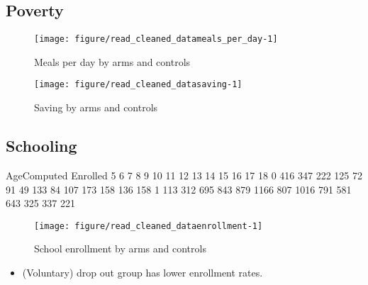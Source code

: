 \subsection{Poverty}


\begin{Schunk}
\begin{figure}

{\centering \texttt{[image: figure/read\_cleaned\_datameals\_per\_day-1]} 

}

\caption[Meals per day by arms and controls]{Meals per day by arms and controls}\label{Figure meals per day}
\end{figure}
\end{Schunk}
\begin{Schunk}
\begin{figure}

{\centering \texttt{[image: figure/read\_cleaned\_datasaving-1]} 

}

\caption[Saving by arms and controls]{Saving by arms and controls}\label{Figure saving}
\end{figure}
\end{Schunk}

\subsection{Schooling}


\begin{Schunk}
\begin{Soutput}
        AgeComputed
Enrolled    5    6    7    8    9   10   11   12   13   14   15   16   17   18
       0  416  347  222  125   72   91   49  133   84  107  173  158  136  158
       1  113  312  695  843  879 1166  807 1016  791  581  643  325  337  221
\end{Soutput}
\begin{figure}

{\centering \texttt{[image: figure/read\_cleaned\_dataenrollment-1]} 

}

\caption[School enrollment by arms and controls]{School enrollment by arms and controls}\label{Figure enrollment}
\end{figure}
\end{Schunk}
\begin{itemize}
\vspace{1.0ex}\setlength{\itemsep}{1.0ex}\setlength{\baselineskip}{12pt}
\item	(Voluntary) drop out group has lower enrollment rates.
\end{itemize}

